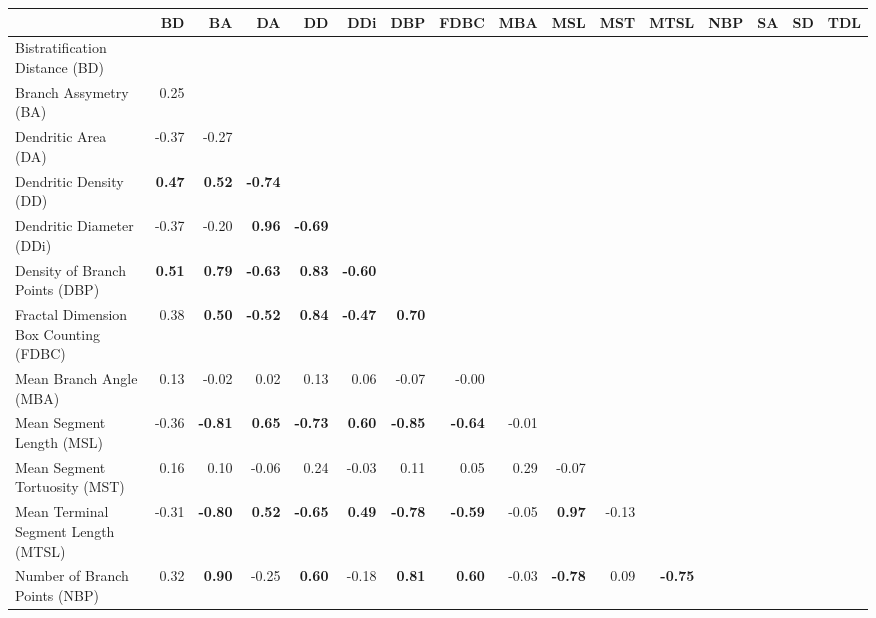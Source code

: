 \documentclass[11pt]{article}
\begin{document}
\clearpage




\begin{sidewaystable}
\begin{tabular}{lrrrrrrrrrrrrrrr}
\toprule
& BD& BA& DA& DD& DDi& DBP& FDBC& MBA& MSL& MST& MTSL& NBP& SA& SD& TDL\\
\midrule
Bistratification Distance (BD) & \textbf{}  &  &  &  &  &  &  &  &  &  &  &  &  &  & \\
Branch Assymetry (BA) & 0.25 & \textbf{}  &  &  &  &  &  &  &  &  &  &  &  &  & \\
Dendritic Area (DA) & -0.37 & -0.27 & \textbf{}  &  &  &  &  &  &  &  &  &  &  &  & \\
Dendritic Density (DD) & \textbf{0.47} & \textbf{0.52} & \textbf{-0.74} & \textbf{}  &  &  &  &  &  &  &  &  &  &  & \\
Dendritic Diameter (DDi) & -0.37 & -0.20 & \textbf{0.96} & \textbf{-0.69} & \textbf{}  &  &  &  &  &  &  &  &  &  & \\
Density of Branch Points (DBP) & \textbf{0.51} & \textbf{0.79} & \textbf{-0.63} & \textbf{0.83} & \textbf{-0.60} & \textbf{}  &  &  &  &  &  &  &  &  & \\
Fractal Dimension Box Counting (FDBC) & 0.38 & \textbf{0.50} & \textbf{-0.52} & \textbf{0.84} & \textbf{-0.47} & \textbf{0.70} & \textbf{}  &  &  &  &  &  &  &  & \\
Mean Branch Angle (MBA) & 0.13 & -0.02 & 0.02 & 0.13 & 0.06 & -0.07 & -0.00 & \textbf{}  &  &  &  &  &  &  & \\
Mean Segment Length (MSL) & -0.36 & \textbf{-0.81} & \textbf{0.65} & \textbf{-0.73} & \textbf{0.60} & \textbf{-0.85} & \textbf{-0.64} & -0.01 & \textbf{}  &  &  &  &  &  & \\
Mean Segment Tortuosity (MST) & 0.16 & 0.10 & -0.06 & 0.24 & -0.03 & 0.11 & 0.05 & 0.29 & -0.07 & \textbf{}  &  &  &  &  & \\
Mean Terminal Segment Length (MTSL) & -0.31 & \textbf{-0.80} & \textbf{0.52} & \textbf{-0.65} & \textbf{0.49} & \textbf{-0.78} & \textbf{-0.59} & -0.05 & \textbf{0.97} & -0.13 & \textbf{}  &  &  &  & \\
Number of Branch Points (NBP) & 0.32 & \textbf{0.90} & -0.25 & \textbf{0.60} & -0.18 & \textbf{0.81} & \textbf{0.60} & -0.03 & \textbf{-0.78} & 0.09 & \textbf{-0.75} & \textbf{}  &  &  & \\

\end{tabular}
\end{sidewaystable}
\end{document}
